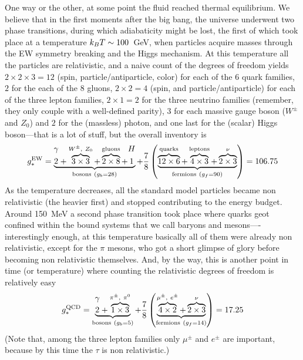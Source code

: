 One way or the other, at some point the fluid reached thermal equilibrium.
We believe that in the first moments after the big bang, the universe underwent
two phase transitions, during which adiabaticity might be lost, the first of which
took place at a temperature $k_B T \sim 100$~GeV, when particles acquire masses through
the EW symmetry breaking and the Higgs mechanism. At this temperature all the
particles are relativistic, and a naive count of the degrees of freedom yields
$2 \times 2 \times 3 = 12$ (spin, particle/antiparticle, color) for each of the 6 quark
families, $2$ for the each of the 8 gluons, $2 \times 2 = 4$ (spin, and particle/antiparticle)
for each of the three lepton families, $2 \times 1 = 2$ for the three neutrino
families (remember, they only couple with a well-defined parity), $3$ for each
massive gauge boson ($W^\pm$ and $Z_0$) and $2$ for the (massless) photon, and one
last for the (scalar) Higgs boson---that is a lot of stuff, but the overall inventory
is
\begin{align*}
  \geff^\text{EW} = \underbrace{\overset{\raisebox{7pt}{$\gamma$}}{2} +
    \overbrace{3 \times 3}^{W^\pm,~Z_0} +
    \overbrace{2 \times 8}^{\text{gluons}} +
    \overset{\raisebox{7pt}{$H$}}{1}}_{\text{bosons}~(g_b = 28)} +
    \frac{7}{8} \left(\underbrace{
      \overbrace{12 \times 6}^{\text{quarks}} +
      \overbrace{4 \times 3}^{\text{leptons}} +
      \overbrace{2 \times 3}^{\nu}}_{\text{fermions}~(g_f = 90)}
    \right) = 106.75
\end{align*}
As the temperature decreases, all the standard model particles became non relativistic
(the heavier first) and stopped contributing to the energy budget. Around 150~MeV a
second phase transition took place where quarks geot confined within the bound systems
that we call baryons and mesons----interestingly enough, at this temperature basically
all of them were already non relativistic, except for the $\pi$ mesons, who got a short
glimpse of glory before becoming non relativistic themselves. And, by the way, this
is another point in time (or temperature) where counting the relativistic degrees
of freedom is relatively easy
\begin{align*}
  \geff^\text{QCD} = \underbrace{\overset{\raisebox{6pt}{$\gamma$}}{2} +
    \overbrace{1 \times 3}^{\pi^\pm,~\pi^0}}_{\text{bosons}~(g_b = 5)} +
    \frac{7}{8} \left(\underbrace{\overbrace{4 \times 2}^{\mu^\pm,~e^\pm} +
      \overbrace{2 \times 3}^{\nu}}_{\text{fermions}~(g_f = 14)}
    \right) = 17.25
\end{align*}
(Note that, among the three lepton families only $\mu^\pm$ and $e^\pm$ are important,
because by this time the $\tau$ is non relativistic.)

